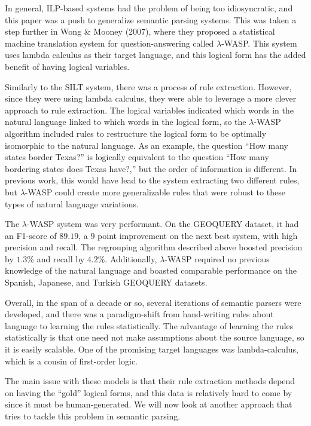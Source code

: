 \documentclass[a4paper]{article}
\theoremstyle{definition}
\begin{document}
\quad In general, ILP-based systems had the problem of being too idiosyncratic, and this paper was a push to generalize semantic parsing systems. This was taken a step further in Wong \& Mooney (2007), where they proposed a statistical machine translation system for question-answering called $\lambda$-WASP. This system uses lambda calculus as their target language, and this logical form has the added benefit of having logical variables.

\quad Similarly to the SILT system, there was a process of rule extraction. However, since they were using lambda calculus, they were able to leverage a more clever approach to rule extraction. The logical variables indicated which words in the natural language linked to which words in the logical form, so the $\lambda$-WASP algorithm included rules to restructure the logical form to be optimally isomorphic to the natural language. As an example, the question ``How many states border Texas?'' is logically equivalent to the question ``How many bordering states does Texas have?,'' but the order of information is different. In previous work, this would have lead to the system extracting two different rules, but $\lambda$-WASP could create more generalizable rules that were robust to these types of natural language variations.

\quad The $\lambda$-WASP system was very performant. On the GEOQUERY dataset, it had an F1-score of $89.19$, a $9$ point improvement on the next best system, with high precision and recall. The regrouping algorithm described above boosted precision by $1.3\%$ and recall by $4.2\%$. Additionally, $\lambda$-WASP required no previous knowledge of the natural language and boasted comparable performance on the Spanish, Japanese, and Turkish GEOQUERY datasets.

\quad Overall, in the span of a decade or so, several iterations of semantic parsers were developed, and there was a paradigm-shift from hand-writing rules about language to learning the rules statistically. The advantage of learning the rules statistically is that one need not make assumptions about the source language, so it is easily scalable. One of the promising target languages was lambda-calculus, which is a cousin of first-order logic.

\quad The main issue with these models is that their rule extraction methods depend on having the ``gold'' logical forms, and this data is relatively hard to come by since it must be human-generated. We will now look at another approach that tries to tackle this problem in semantic parsing.
\end{document}
